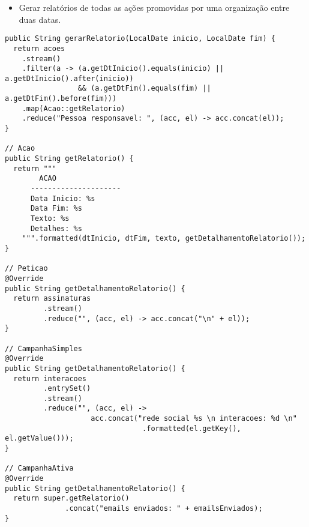\documentclass{lib/eng_softdoc}
\begin{document}
\begin{itemize}
  \item Gerar relatórios de todas as ações promovidas por uma organização entre duas datas.
\end{itemize}
\answer 
\begin{lstlisting}
public String gerarRelatorio(LocalDate inicio, LocalDate fim) {
  return acoes
    .stream()
    .filter(a -> (a.getDtInicio().equals(inicio) || a.getDtInicio().after(inicio))
                 && (a.getDtFim().equals(fim) || a.getDtFim().before(fim)))
    .map(Acao::getRelatorio)
    .reduce("Pessoa responsavel: ", (acc, el) -> acc.concat(el));
} 

// Acao
public String getRelatorio() {
  return """
        ACAO
      ---------------------
      Data Inicio: %s
      Data Fim: %s
      Texto: %s
      Detalhes: %s
    """.formatted(dtInicio, dtFim, texto, getDetalhamentoRelatorio());
}

// Peticao 
@Override
public String getDetalhamentoRelatorio() {
  return assinaturas
         .stream()
         .reduce("", (acc, el) -> acc.concat("\n" + el));
}

// CampanhaSimples 
@Override
public String getDetalhamentoRelatorio() {
  return interacoes
         .entrySet()
         .stream()
         .reduce("", (acc, el) -> 
                    acc.concat("rede social %s \n interacoes: %d \n"
                                .formatted(el.getKey(), el.getValue()));
}

// CampanhaAtiva 
@Override
public String getDetalhamentoRelatorio() {
  return super.getRelatorio()
              .concat("emails enviados: " + emailsEnviados);
}
\end{lstlisting}
\end{document}
